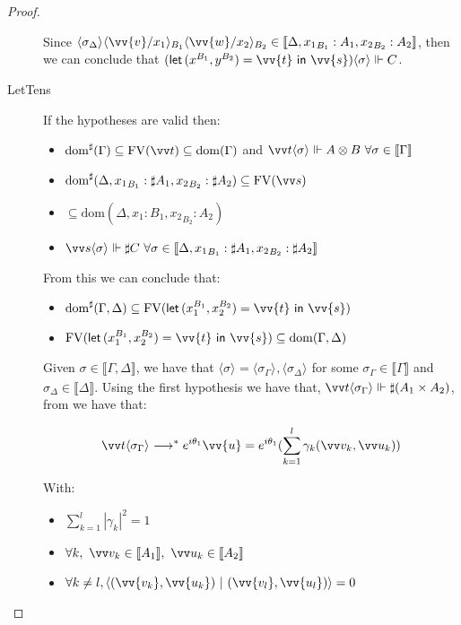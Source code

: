 \documentclass[runningheads,orivec,envcountsame,envcountsect]{llncs}
\newcommand\lra{\longrightarrow}
\newcommand\ansubst[2]{\ensuremath{\langle #1 \rangle_{#2}}}
\newcommand\dom[1]{\mathrm{dom}(#1)}
\newcommand\sdom[1]{\mathrm{dom}^{\sharp}(#1)}
\newcommand\FV[1]{\mathrm{FV}(#1)}
\def\scal#1#2{\langle{#1}~|~{#2}\rangle}
\def\Pair#1#2{(#1,#2)} %
\def\letkeyword{\mathsf{let}}
\def\inkeyword{\mathsf{in}}
\def\LetP#1#2#3#4#5#6{\letkeyword\,\Pair{#1^{#2}}{#3^{#4}}=#5~\inkeyword~#6}
\def\eval{\lra^*}
\def\sem#1{\llbracket#1\rrbracket}
\def\real{\Vdash}
\begin{document}
\begin{proof}
\begin{description}
    Since $\ansubst{\sigma_\Delta}{}\ansubst{\vv{v}/x_1}{B_1}\ansubst{\vv{w}/x_2}{B_2}\in\sem{\Delta,{x_1}_{B_1}:A_1,{x_2}_{B_2}:A_2}$, then we can conclude that $(\LetP{x}{B_1}{y}{B_2}{\vv{t}}{\vv{s}})\ansubst{\sigma}{}\real C$.

    \item[LetTens] If the hypotheses are valid then:
    \begin{itemize}
        \item $\sdom{\Gamma}\subseteq \FV{\vv t} \subseteq \dom{\Gamma}$ and $\vv t \ansubst{\sigma}{}\Vdash A\otimes B\ \forall \sigma\in\sem\Gamma$
        \item $\sdom{\Delta, {x_1}_{B_1}:\sharp A_1, {x_2}_{B_2}:\sharp A_2}\subseteq \FV{\vv s}$
        \item $\subseteq \dom{\Delta,{x_1}:{B_1}, {x_2}_{B_2}:A_2}$
        \item $\vv s \ansubst{\sigma}{}\Vdash \sharp C\ \forall \sigma\in\sem{\Delta, {x_1}_{B_1}:\sharp A_1, {x_2}_{B_2}:\sharp A_2}$
    \end{itemize}
    
    From this we can conclude that:
    \begin{itemize}
        \item $\sdom{\Gamma,\Delta}\subseteq\FV{\LetP{x_1}{B_1}{x_2}{B_2}{\vv{t}}{\vv{s}}}$
        \item $\FV{\LetP{x_1}{B_1}{x_2}{B_2}{\vv{t}}{\vv{s}}}\subseteq\dom{\Gamma,\Delta}$
    \end{itemize}
    
    Given $\sigma\in\sem{\Gamma,\Delta}$, we have that $\ansubst{\sigma}{}=\ansubst{\sigma_\Gamma}{},\ansubst{\sigma_\Delta}{}$ for some $\sigma_\Gamma\in\sem\Gamma$ and $\sigma_\Delta\in\sem\Delta$. Using the first hypothesis we have that, $\vv t\ansubst{\sigma_\Gamma}{}\real \sharp(A_1\times A_2)$, from  we have that:
    
    \[\vv t\ansubst{\sigma_\Gamma}{}\eval e^{i\theta_1}\vv{u}=e^{i\theta_1}(\sum_{k=1}^{l} \gamma_k \Pair{\vv v_k}{\vv u_k})\] 
    
    With:
    \begin{itemize}
        \item $\sum_{k=1}^{l} |\gamma_k|^2 = 1$
        \item $\forall k,\ \vv v_k\in\sem{A_1},\ \vv u_k\in\sem{A_2}$
        \item $\forall k\neq l, \scal{\Pair{\vv{v_k}}{\vv{u_k}}}{\Pair{\vv{v_l}}{\vv{u_l}}}= 0$
    \end{itemize}
    

\end{description}
\end{proof}
\end{document}
